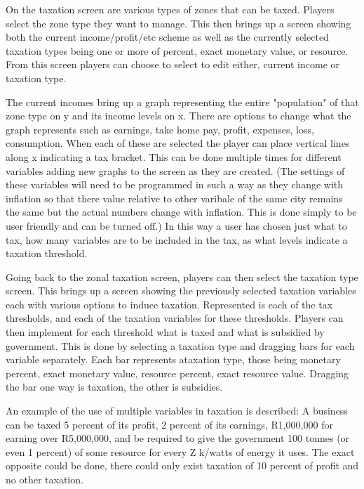On the taxation screen are various types of zones that can be taxed. Players select the zone type they want to manage. This then brings up a screen showing both the current income/profit/etc scheme as well as the currently selected taxation types being one or more of percent, exact monetary value, or resource. 
From this screen players can choose to select to edit either, current income or taxation type.

The current incomes bring up a graph representing the entire "population" of that zone type on y and its income levels on x. There are options to change what the graph represents such as earnings, take home pay, profit, expenses, loss, consumption. When each of these are selected the player can place vertical lines along x indicating a tax bracket. This can be done multiple times for different variables adding new graphs to the screen as they are created. (The settings of these variables will need to be programmed in such a way as they change with inflation so that there value relative to other varibale of the same city remains the same but the actual numbers change with inflation. This is done simply to be user friendly and can be turned off.) In this way a user has chosen just what to tax, how many variables are to be included in the tax, as what levels indicate a taxation threshold.

Going back to the zonal taxation screen, players can then select the taxation type screen. This brings up a screen showing the previously selected taxation variables each with various options to induce taxation. Represented is each of the tax thresholds, and each of the taxation variables for these thresholds. Players can then implement for each threshold what is taxed and what is subsidied by government. This is done by selecting a taxation type and dragging bars for each variable separately. Each bar represents ataxation type, those being monetary percent, exact monetary value, resource percent, exact resource value. Dragging the bar one way is taxation, the other is subsidies.

An example of the use of multiple variables in taxation is described:
A business can be taxed 5 percent of its profit, 2 percent of its earnings, R1,000,000 for earning over R5,000,000, and be required to give the government 100 tonnes (or even 1 percent) of some resource for every Z k/watts of energy it uses. The exact opposite could be done, there could only exist taxation of 10 percent of profit and no other taxation. 

